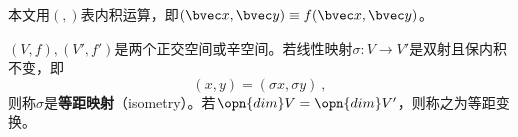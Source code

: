 本文用$(,)$表内积运算，即$(\bvec x,\bvec y)\equiv f(\bvec x,\bvec y) $。
\begin{definition}{}
$(V,f),(V',f')$是两个正交空间或辛空间。若线性映射$\sigma:V\rightarrow V'$是双射且保内积不变，即\begin{equation}
(x,y)=(\sigma x,\sigma y)~,
\end{equation}
则称$\sigma $是\textbf{等距映射}（isometry）。若$\opn{dim}V=\opn{dim}V'$，则称之为等距变换。
\end{definition}
